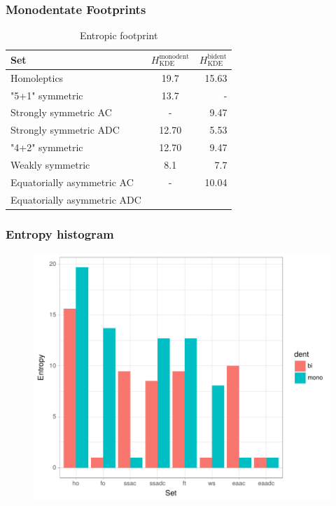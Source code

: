 \documentclass[xcolor=dvipsnames]{beamer}
\begin{document}
\begin{frame}
\begin{figure}[ht]
\begin{minipage}[b]{0.5\linewidth}
		\vspace{2ex}
	\end{minipage} 
\end{figure}
\end{frame}

\begin{frame}
\frametitle{Monodentate Footprints}
	\begin{table}[]
	\centering
	\caption{Entropic footprint}
	\label{tab:ent-footprint}
	\begin{tabular}{lcr}
		\toprule
		Set 					    &  $H_{\textrm{KDE}}^{\textrm{monodent}}$   & $H_{\textrm{KDE}}^{\textrm{bident}}$ \\
		\midrule
		Homoleptics                 &  19.7  & 15.63   \\[0.1cm]
		"5+1" symmetric             &  13.7  & -       \\[0.1cm]
		Strongly symmetric AC       &  -     & 9.47    \\[0.1cm]
		Strongly symmetric ADC      &  12.70 & 5.53    \\[0.1cm]
		"4+2" symmetric             &  12.70 & 9.47    \\[0.1cm] 
		Weakly symmetric            &  8.1   & 7.7     \\[0.1cm]
		Equatorially asymmetric AC  &  -     & 10.04   \\[0.1cm]
		Equatorially asymmetric ADC &        &         \\[0.1cm]

		\bottomrule
	\end{tabular}
	\end{table}
\end{frame}

\begin{frame}
\frametitle{Entropy histogram}
\begin{figure}
\includegraphics[width=0.7\linewidth]{img/ent.pdf}
\end{figure}
\end{frame}
\end{document}
